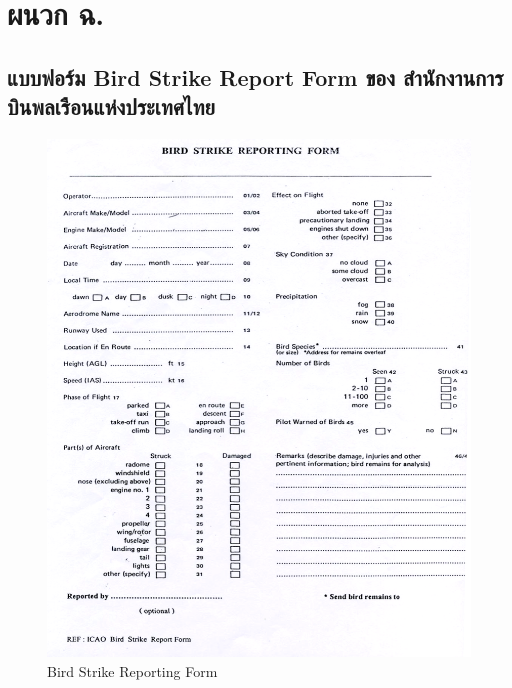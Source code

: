 
\chapter{ผนวก ฉ.}\label{ผนวก ฉ.}

\section{แบบฟอร์ม Bird Strike Report Form ของ สำนักงานการบินพลเรือนแห่งประเทศไทย}\label{แบบฟอร์ม Bird Strike Report Form ของ สำนักงานการบินพลเรือนแห่งประเทศไทย}

\begin{figure}[ht]
\begin{center}
\includegraphics[width=\linewidth]{Bird_Strike_Report_Form.png}
\caption{Bird Strike Reporting Form}
\label{Bird Strike Reporting Form}
\end{center}
\end{figure}